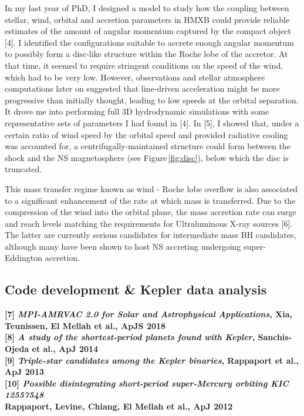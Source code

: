 \documentclass[letterpaper,12pt,onecolumn]{article}
\makeatletter
\newcommand*{\hmxb}{HMXB\@\xspace}
\newcommand*{\ns}{NS\@\xspace}
\newcommand*{\bh}{BH\@\xspace}
\makeatother
\begin{document}
In my last year of PhD, I designed a model to study how the coupling between stellar, wind, orbital and accretion parameters in \hmxb could provide reliable estimates of the amount of angular momentum captured by the compact object [4]. I identified the configurations suitable to accrete enough angular momentum to possibly form a disc-like structure within the Roche lobe of the accretor. At that time, it seemed to require stringent conditions on the speed of the wind, which had to be very low. However, observations and stellar atmosphere computations later on suggested that line-driven acceleration might be more progressive than initially thought, leading to low speeds at the orbital separation. It drove me into performing full 3D hydrodynamic simulations with some representative sets of parameters I had found in [4]. In [5], I showed that, under a certain ratio of wind speed by the orbital speed and provided radiative cooling was accounted for, a centrifugally-maintained structure could form between the shock and the \ns magnetosphere (see Figure\,\ref{fig:disc}), below which the disc is truncated. 

This mass transfer regime known as wind - Roche lobe overflow is also associated to a significant enhancement of the rate at which mass is transferred. Due to the compression of the wind into the orbital plane, the mass accretion rate can surge and reach levels matching the requirements for Ultraluminous X-ray sources [6]. The latter are currently serious candidates for intermediate mass \bh candidates, although many have been shown to host \ns accreting undergoing super-Eddington accretion.

\subsection*{Code development \& Kepler data analysis}

\footnotesize
\textbf{[7] \textit{MPI-AMRVAC 2.0 for Solar and Astrophysical Applications}, Xia, Teunissen, El Mellah et al., ApJS 2018}\\
\textbf{[8] \textit{A study of the shortest-period planets found with Kepler}, Sanchis-Ojeda et al., ApJ 2014}\\
\textbf{[9] \textit{Triple-star candidates among the Kepler binaries}, Rappaport et al., ApJ 2013}\\
\textbf{[10] \textit{Possible disintegrating short-period super-Mercury orbiting KIC 12557548}}\\
\hspace*{20pt}\textbf{Rappaport, Levine, Chiang, El Mellah et al., ApJ 2012}\\
\end{document}
